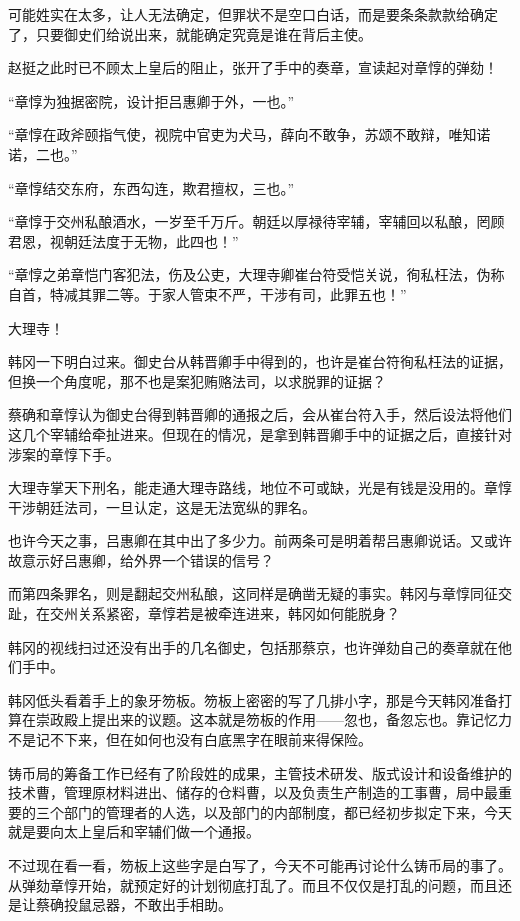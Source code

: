 可能姓实在太多，让人无法确定，但罪状不是空口白话，而是要条条款款给确定了，只要御史们给说出来，就能确定究竟是谁在背后主使。

赵挺之此时已不顾太上皇后的阻止，张开了手中的奏章，宣读起对章惇的弹劾！

“章惇为独据密院，设计拒吕惠卿于外，一也。”

“章惇在政斧颐指气使，视院中官吏为犬马，薛向不敢争，苏颂不敢辩，唯知诺诺，二也。”

“章惇结交东府，东西勾连，欺君擅权，三也。”

“章惇于交州私酿酒水，一岁至千万斤。朝廷以厚禄待宰辅，宰辅回以私酿，罔顾君恩，视朝廷法度于无物，此四也！”

“章惇之弟章恺门客犯法，伤及公吏，大理寺卿崔台符受恺关说，徇私枉法，伪称自首，特减其罪二等。于家人管束不严，干涉有司，此罪五也！”

大理寺！

韩冈一下明白过来。御史台从韩晋卿手中得到的，也许是崔台符徇私枉法的证据，但换一个角度呢，那不也是案犯贿赂法司，以求脱罪的证据？

蔡确和章惇认为御史台得到韩晋卿的通报之后，会从崔台符入手，然后设法将他们这几个宰辅给牵扯进来。但现在的情况，是拿到韩晋卿手中的证据之后，直接针对涉案的章惇下手。

大理寺掌天下刑名，能走通大理寺路线，地位不可或缺，光是有钱是没用的。章惇干涉朝廷法司，一旦认定，这是无法宽纵的罪名。

也许今天之事，吕惠卿在其中出了多少力。前两条可是明着帮吕惠卿说话。又或许故意示好吕惠卿，给外界一个错误的信号？

而第四条罪名，则是翻起交州私酿，这同样是确凿无疑的事实。韩冈与章惇同征交趾，在交州关系紧密，章惇若是被牵连进来，韩冈如何能脱身？

韩冈的视线扫过还没有出手的几名御史，包括那蔡京，也许弹劾自己的奏章就在他们手中。

韩冈低头看着手上的象牙笏板。笏板上密密的写了几排小字，那是今天韩冈准备打算在崇政殿上提出来的议题。这本就是笏板的作用——忽也，备忽忘也。靠记忆力不是记不下来，但在如何也没有白底黑字在眼前来得保险。

铸币局的筹备工作已经有了阶段姓的成果，主管技术研发、版式设计和设备维护的技术曹，管理原材料进出、储存的仓料曹，以及负责生产制造的工事曹，局中最重要的三个部门的管理者的人选，以及部门的内部制度，都已经初步拟定下来，今天就是要向太上皇后和宰辅们做一个通报。

不过现在看一看，笏板上这些字是白写了，今天不可能再讨论什么铸币局的事了。从弹劾章惇开始，就预定好的计划彻底打乱了。而且不仅仅是打乱的问题，而且还是让蔡确投鼠忌器，不敢出手相助。

